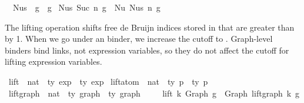\begin{isabellebody}
\ \ {\isachardoublequoteopen}Nus{}\ {}\ g\ {\isacharequal}{\kern0pt}\ g{\isachardoublequoteclose}\isanewline
{\isacharbar}{\kern0pt}\ {\isachardoublequoteopen}Nus{}\ {\isacharparenleft}{\kern0pt}Suc\ n{\isacharparenright}{\kern0pt}\ g\ {\isacharequal}{\kern0pt}\ Nu\ {\isacharparenleft}{\kern0pt}Nus{}\ n\ g{\isacharparenright}{\kern0pt}{\isachardoublequoteclose}%
\isadelimdocument
%
\endisadelimdocument
%
\isatagdocument
%
\isamarkuptrue%
%
\endisatagdocument
{\isafolddocument}%
%
\isadelimdocument
%
\endisadelimdocument
%
\begin{isamarkuptext}%
The lifting operation  shifts free de Bruijn indices
  stored in  that are greater than by 1.
  When we go under an  binder, we increase the cutoff to .
  Graph-level binders  bind links, not expression variables,
  so they do not affect the cutoff for lifting expression variables.%
\end{isamarkuptext}\isamarkuptrue%
\isamarkupfalse%
\ lift\ {\isacharcolon}{\kern0pt}{\isacharcolon}{\kern0pt}\ {\isachardoublequoteopen}nat\ {\isacharequal}{\kern0pt}{\isachargreater}{\kern0pt}\ {\isacharprime}{\kern0pt}ty\ exp\ {\isacharequal}{\kern0pt}{\isachargreater}{\kern0pt}\ {\isacharprime}{\kern0pt}ty\ exp{\isachardoublequoteclose}\isanewline
{}\ lift{\isacharunderscore}{\kern0pt}atom\ {\isacharcolon}{\kern0pt}{\isacharcolon}{\kern0pt}\ {\isachardoublequoteopen}nat\ {\isacharequal}{\kern0pt}{\isachargreater}{\kern0pt}\ {\isacharprime}{\kern0pt}ty\ p\ {\isacharequal}{\kern0pt}{\isachargreater}{\kern0pt}\ {\isacharprime}{\kern0pt}ty\ p{\isachardoublequoteclose}\isanewline
{}\ lift{\isacharunderscore}{\kern0pt}graph\ {\isacharcolon}{\kern0pt}{\isacharcolon}{\kern0pt}\ {\isachardoublequoteopen}nat\ {\isacharequal}{\kern0pt}{\isachargreater}{\kern0pt}\ {\isacharprime}{\kern0pt}ty\ graph\ {\isacharequal}{\kern0pt}{\isachargreater}{\kern0pt}\ {\isacharprime}{\kern0pt}ty\ graph{\isachardoublequoteclose}\isanewline
{}\isanewline
\ \ \isanewline
\ \ {\isachardoublequoteopen}lift\ k\ {\isacharparenleft}{\kern0pt}Graph\ g{\isacharparenright}{\kern0pt}\ {\isacharequal}{\kern0pt}\ Graph\ {\isacharparenleft}{\kern0pt}lift{\isacharunderscore}{\kern0pt}graph\ k\ g{\isacharparenright}{\kern0pt}{\isachardoublequoteclose}\isanewline

\end{isabellebody}
